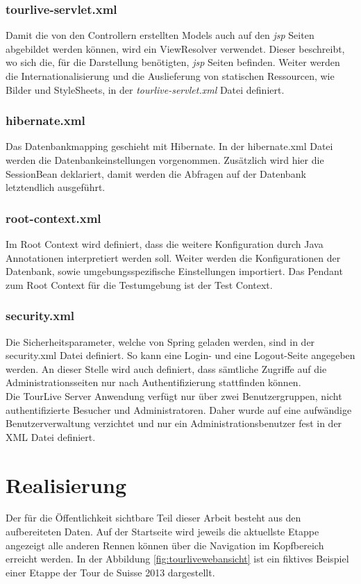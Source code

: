 \subsubsection{tourlive-servlet.xml}
Damit die von den Controllern erstellten Models auch auf den \textit{\gls{jsp}} Seiten abgebildet werden können, wird ein ViewResolver verwendet. Dieser beschreibt, wo sich die, für die Darstellung benötigten, \textit{\gls{jsp}} Seiten befinden. Weiter werden die Internationalisierung und die Auslieferung von statischen Ressourcen, wie Bilder und StyleSheets, in der \textit{tourlive-servlet.xml} Datei definiert.

\subsubsection{hibernate.xml}
Das Datenbankmapping geschieht mit Hibernate. In der hibernate.xml Datei werden die Datenbankeinstellungen vorgenommen. Zusätzlich wird hier die SessionBean deklariert, damit werden die Abfragen auf der Datenbank letztendlich ausgeführt.

\subsubsection{root-context.xml}
Im Root Context wird definiert, dass die weitere Konfiguration durch Java Annotationen interpretiert werden soll. Weiter werden die Konfigurationen der Datenbank, sowie umgebungsspezifische Einstellungen importiert. Das Pendant zum Root Context für die Testumgebung ist der Test Context.

\subsubsection{security.xml}
Die Sicherheitsparameter, welche von Spring geladen werden, sind in der security.xml Datei definiert. So kann eine Login- und eine Logout-Seite angegeben werden. An dieser Stelle wird auch definiert, dass sämtliche Zugriffe auf die Administrationsseiten nur nach Authentifizierung stattfinden können.
\\

Die TourLive Server Anwendung verfügt nur über zwei Benutzergruppen, nicht authentifizierte Besucher und Administratoren. Daher wurde auf eine aufwändige Benutzerverwaltung verzichtet und nur ein Administrationsbenutzer fest in der XML Datei definiert.

\section{Realisierung}
Der für die Öffentlichkeit sichtbare Teil dieser Arbeit besteht aus den aufbereiteten Daten. Auf der Startseite wird jeweils die aktuellste Etappe angezeigt alle anderen Rennen können über die Navigation im Kopfbereich erreicht werden. In der Abbildung \ref{fig:tourlivewebansicht} ist ein fiktives Beispiel einer Etappe der Tour de Suisse 2013 dargestellt.

